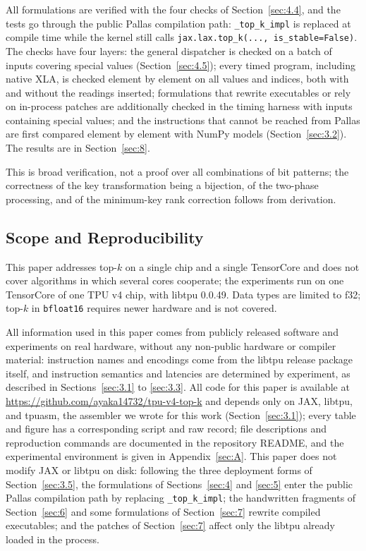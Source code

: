 \documentclass[sigconf,nonacm,balance=false]{acmart}
\newcommand{\code}[1]{\texttt{#1}}
\begin{document}
All formulations are verified with the four checks of Section~\ref{sec:4.4}, and the tests go through the public Pallas compilation path: \code{\_\allowbreak{}top\_\allowbreak{}k\_\allowbreak{}impl} is replaced at compile time while the kernel still calls \code{jax.\allowbreak{}lax.\allowbreak{}top\_\allowbreak{}k(\allowbreak{}.\allowbreak{}.\allowbreak{}.\allowbreak{},\allowbreak{} is\_\allowbreak{}stable=\allowbreak{}False)}. The checks have four layers: the general dispatcher is checked on a batch of inputs covering special values (Section~\ref{sec:4.5}); every timed program, including native XLA, is checked element by element on all values and indices, both with and without the readings inserted; formulations that rewrite executables or rely on in-process patches are additionally checked in the timing harness with inputs containing special values; and the instructions that cannot be reached from Pallas are first compared element by element with NumPy models (Section~\ref{sec:3.2}). The results are in Section~\ref{sec:8}.

This is broad verification, not a proof over all combinations of bit patterns; the correctness of the key transformation being a bijection, of the two-phase processing, and of the minimum-key rank correction follows from derivation.

\subsection{Scope and Reproducibility}
\label{sec:3.7}

This paper addresses top-$k$ on a single chip and a single TensorCore and does not cover algorithms in which several cores cooperate; the experiments run on one TensorCore of one TPU v4 chip, with libtpu 0.0.49. Data types are limited to f32; top-$k$ in \code{bfloat16} requires newer hardware and is not covered.

All information used in this paper comes from publicly released software and experiments on real hardware, without any non-public hardware or compiler material: instruction names and encodings come from the libtpu release package itself, and instruction semantics and latencies are determined by experiment, as described in Sections~\ref{sec:3.1} to \ref{sec:3.3}. All code for this paper is available at \url{https://github.com/ayaka14732/tpu-v4-top-k} and depends only on JAX, libtpu, and tpuasm, the assembler we wrote for this work (Section~\ref{sec:3.1}); every table and figure has a corresponding script and raw record; file descriptions and reproduction commands are documented in the repository README, and the experimental environment is given in Appendix~\ref{sec:A}. This paper does not modify JAX or libtpu on disk: following the three deployment forms of Section~\ref{sec:3.5}, the formulations of Sections~\ref{sec:4} and \ref{sec:5} enter the public Pallas compilation path by replacing \code{\_\allowbreak{}top\_\allowbreak{}k\_\allowbreak{}impl}; the handwritten fragments of Section~\ref{sec:6} and some formulations of Section~\ref{sec:7} rewrite compiled executables; and the patches of Section~\ref{sec:7} affect only the libtpu already loaded in the process.
\end{document}
